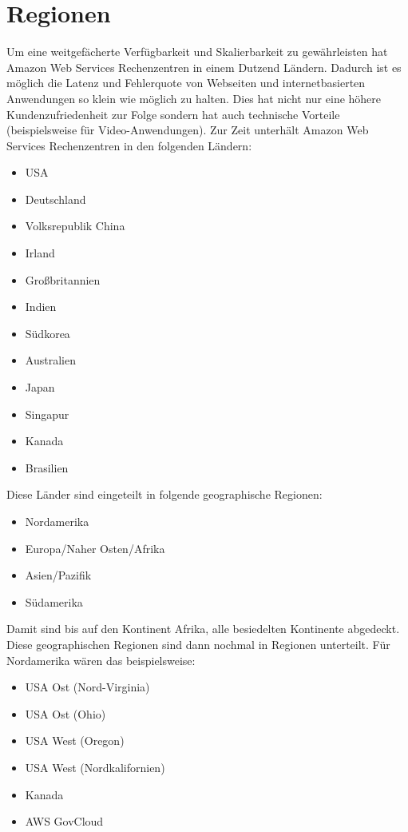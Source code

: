 \documentclass[titlepage]{report}
\begin{document}
\section*{Regionen}
Um eine weitgefächerte Verfügbarkeit und Skalierbarkeit zu gewährleisten
hat Amazon Web Services Rechenzentren in einem Dutzend Ländern. Dadurch
ist es möglich die Latenz und Fehlerquote von Webseiten und internetbasierten
Anwendungen so klein wie möglich zu halten. Dies hat nicht nur eine
höhere Kundenzufriedenheit zur Folge sondern hat auch technische
Vorteile (beispielsweise für Video\hyp{}Anwendungen). Zur Zeit unterhält
Amazon Web Services Rechenzentren in den folgenden Ländern:
\begin{itemize}
    \item USA
    \item Deutschland
    \item Volksrepublik China
    \item Irland
    \item Großbritannien
    \item Indien
    \item Südkorea
    \item Australien
    \item Japan
    \item Singapur
    \item Kanada
    \item Brasilien
\end{itemize}
Diese Länder sind eingeteilt in folgende geographische Regionen:
\begin{itemize}
    \item Nordamerika
    \item Europa/Naher Osten/Afrika
    \item Asien/Pazifik
    \item Südamerika
\end{itemize}
Damit sind bis auf den Kontinent Afrika, alle besiedelten Kontinente
abgedeckt. Diese geographischen Regionen sind dann nochmal in Regionen
unterteilt. Für Nordamerika wären das beispielsweise\cite{region}:
\begin{itemize}
    \item USA Ost (Nord\hyp{}Virginia)
    \item USA Ost (Ohio)
    \item USA West (Oregon)
    \item USA West (Nordkalifornien)
    \item Kanada
    \item AWS GovCloud
\end{itemize}
\end{document}
